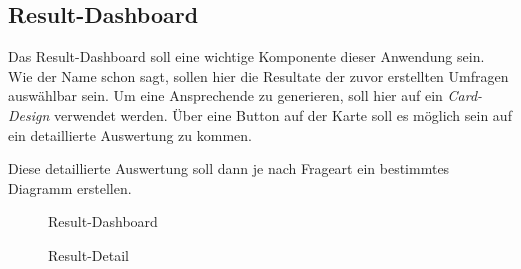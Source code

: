 \subsection{Result-Dashboard}
\label{ssec:ResultDashboard}

Das Result-Dashboard soll eine wichtige Komponente dieser Anwendung sein. 
Wie der Name schon sagt, sollen hier die Resultate der zuvor erstellten Umfragen auswählbar sein. 
Um eine Ansprechende  zu generieren, soll hier auf ein \emph{Card-Design} verwendet werden. 
Über eine Button auf der Karte soll es möglich sein auf ein detaillierte Auswertung zu kommen. 

Diese detaillierte Auswertung soll dann je nach Frageart ein bestimmtes Diagramm erstellen. 

\begin{figure}
	\caption[Result-Dashboard]{Result-Dashboard \\ \quelle}
	\label{fig:MockResultDashboard}
\end{figure}

\begin{figure}
	\caption[Result-Detail]{Result-Detail \\ \quelle}
	\label{fig:MockResultDetail}
\end{figure}
